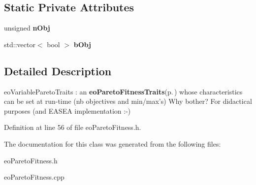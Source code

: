 \subsection*{Static Private Attributes}
\begin{CompactItemize}
\item 
unsigned {\bf n\-Obj}\label{classeo_variable_pareto_traits_v0}

\item 
std::vector$<$ bool $>$ {\bf b\-Obj}\label{classeo_variable_pareto_traits_v1}

\end{CompactItemize}


\subsection{Detailed Description}
eo\-Variable\-Pareto\-Traits : an {\bf eo\-Pareto\-Fitness\-Traits}{\rm (p.\,\pageref{classeo_pareto_fitness_traits})} whose characteristics can be set at run-time (nb objectives and min/max's) Why bother? For didactical purposes (and EASEA implementation :-) 



Definition at line 56 of file eo\-Pareto\-Fitness.h.

The documentation for this class was generated from the following files:\begin{CompactItemize}
\item 
eo\-Pareto\-Fitness.h\item 
eo\-Pareto\-Fitness.cpp\end{CompactItemize}
